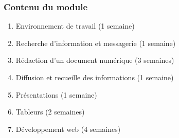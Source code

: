 \documentclass{beamer}
\begin{document}
\begin{frame}
\frametitle{Contenu du module}

\begin{enumerate}
	\item Environnement de travail (1 semaine)
	\item Recherche d'information et messagerie (1 semaine)
	\item Rédaction d'un document numérique (3 semaines)
	\item Diffusion et recueille des informations (1 semaine)
	\item Présentations (1 semaine)
	\item Tableurs (2 semaines) 
	\item Développement web (4 semaines)
\end{enumerate}

\end{frame}
\end{document}
